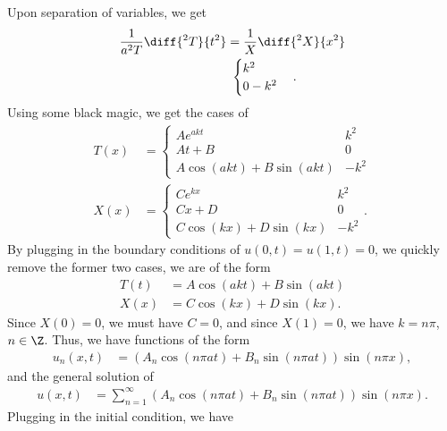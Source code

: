 \documentclass[10pt]{mypackage}
\begin{document}
\RaggedRight
\begin{solution}[12.4, Problem 6]
  Upon separation of variables, we get
  \begin{align*}
    \frac{1}{a^2 T}\diff{^2T}{t^2} &= \frac{1}{X}\diff{^2X}{x^2}\\
                               &\ \begin{cases}
                                 k^2\\
                                 0
                                 -k^2
                               \end{cases}.
  \end{align*}
  Using some black magic, we get the cases of
  \begin{align*}
    T(x) &= \begin{cases}
      Ae^{akt} & k^2\\
      At + B & 0\\
      A\cos\left( akt \right) + B\sin\left( akt \right) & -k^2
    \end{cases}\\
    X(x) &= \begin{cases}
      Ce^{kx} & k^2\\
      Cx + D & 0\\
      C\cos\left( kx \right) + D\sin\left( kx \right) & -k^2
    \end{cases}.
  \end{align*}
  By plugging in the boundary conditions of $u(0,t) = u\left( 1,t \right) = 0$, we quickly remove the former two cases, we are of the form
  \begin{align*}
    T(t) &= A\cos\left( akt \right) + B\sin\left( akt \right)\\
    X(x) &= C\cos\left( kx \right) + D\sin\left( kx \right).
  \end{align*}
  Since $X(0) = 0$, we must have $C = 0$, and since $X(1) = 0$, we have $k= n\pi$, $n\in\Z$. Thus, we have functions of the form
  \begin{align*}
    u_n\left( x,t \right) &= \left( A_n\cos\left( n\pi at \right) + B_n\sin\left( n\pi at \right) \right) \sin\left( n\pi x \right),
  \end{align*}
  and the general solution of
  \begin{align*}
    u\left( x,t \right) &= \sum_{n=1}^{\infty} \left( A_n\cos\left( n\pi a t \right) + B_n\sin\left( n\pi a t \right) \right)\sin\left( n\pi x \right).
  \end{align*}
  Plugging in the initial condition, we have

\end{solution}
\end{document}
